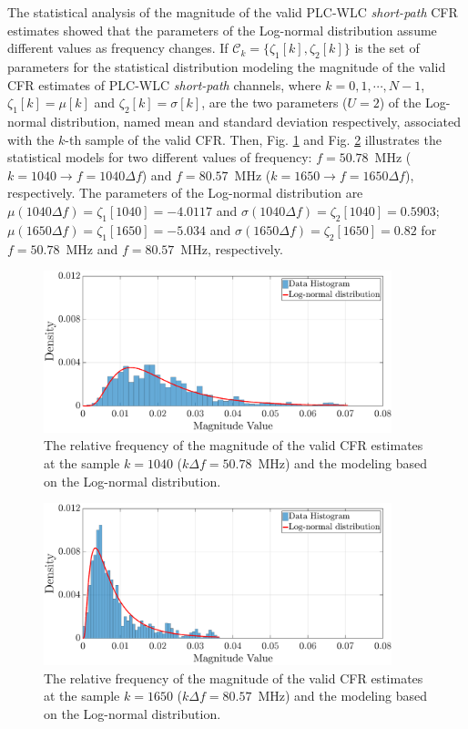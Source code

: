 The statistical analysis of the magnitude of the valid \ac{PLC}-\ac{WLC} \textit{short-path} \ac{CFR} estimates showed that the parameters of the Log-normal distribution assume different values as frequency changes. If $\mathcal{C}_{k} = \{\zeta_1[k],\zeta_2[k]\}$ is the set of parameters for the statistical distribution modeling the magnitude of the valid \ac{CFR} estimates of \ac{PLC}-\ac{WLC} \textit{short-path} channels, where $k=0,1,\cdots,N-1$,  $\zeta_1[k] = \mu[k]$ and $\zeta_2[k] = \sigma[k]$, are the two parameters ($U=2$) of the Log-normal distribution, named mean and standard deviation respectively, associated with the $k$-th sample of the valid \ac{CFR}. Then, Fig. \ref{mag_examplesW} and Fig. \ref{mag_example2sW} illustrates the statistical models for two different values of frequency: $f=50.78$~MHz ($k=1040 \rightarrow f = 1040\Delta f$) and $f=80.57$~MHz ($k=1650 \rightarrow f = 1650\Delta f$), respectively. The parameters of the Log-normal distribution are  $\mu(1040 \Delta f) = \zeta_1[1040]=-4.0117$ and $\sigma( 1040 \Delta f) = \zeta_2[1040] = 0.5903$; $\mu(1650 \Delta f) = \zeta_1[1650] = -5.034$ and $\sigma( 1650 \Delta f) = \zeta_2[1650]=0.82$ for $f=50.78$~MHz and $f=80.57$~MHz, respectively.

\begin{figure}[h!]
	\centering
	\includegraphics[width=0.9\textwidth]{images/Mag_histsW_2.eps}
	\caption{The relative frequency of the magnitude of the valid CFR estimates at the sample $k = 1040$ ($k\Delta f= 50.78$~MHz) and the modeling based on the Log-normal distribution.}
	\label{mag_examplesW}
\end{figure}

\begin{figure}[h!]
	\centering
	\includegraphics[width=0.9\textwidth]{images/Mag_hist2sW_2.eps}
	\caption{ The relative frequency of the magnitude of the valid CFR estimates at the sample $k = 1650$ ($k\Delta f= 80.57$~MHz) and the modeling based on the Log-normal distribution.}
	\label{mag_example2sW}
\end{figure}

